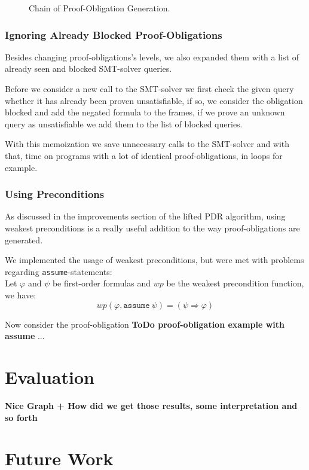 \documentclass[11pt, a4paper, BCOR=10mm, ngerman]{scrbook}
\begin{document}
\begin{figure}[H]
\centering
\resizebox{\textwidth}{!}{}
\caption{Chain of Proof-Obligation Generation.}
\label{fig:the_nice_figure}
\end{figure}
 

\subsection{Ignoring Already Blocked Proof-Obligations}
Besides changing proof-obligations's levels, we also expanded them with a list of already seen and blocked SMT-solver queries. \par Before we consider a new call to the SMT-solver we first check the given query whether it has already been proven unsatisfiable, if so, we consider the obligation blocked and add the negated formula to the frames, if we prove an unknown query as unsatisfiable we add them to the list of blocked queries. \par
With this memoization we save unnecessary calls to the SMT-solver and with that, time on programs with a lot of identical proof-obligations, in loops for example.

\subsection{Using Preconditions}
As discussed in the improvements section of the lifted PDR algorithm, using weakest preconditions is a really useful addition to the way proof-obligations are generated. \par
We implemented the usage of weakest preconditions, but were met with problems regarding \texttt{assume}-statements: \\
Let $\varphi$ and $\psi$ be first-order formulas and $wp$ be the weakest precondition function, we have: 
\begin{equation}
	wp(\varphi, \texttt{assume}\ \psi) = (\psi \Rightarrow \varphi)
\end{equation}

Now consider the proof-obligation \textbf{ToDo proof-obligation example with assume}
...


\chapter{Evaluation}
\textbf{Nice Graph + How did we get those results, some interpretation and so forth}


\chapter{Future Work}
\end{document}
